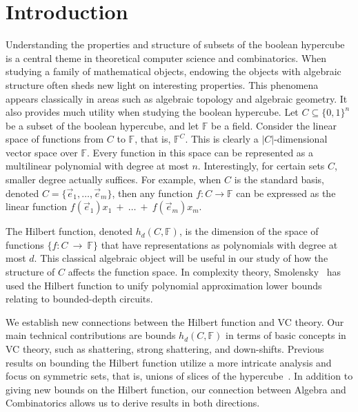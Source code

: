 \documentclass[11pt]{article}
\theoremstyle{definition}
\newcommand{\1}{\mathbf{1}}
\newcommand{\F}{{\mathbb F}}
\begin{document}
\section{Introduction}
Understanding  the properties and structure of subsets of the boolean hypercube is a central theme in theoretical computer science and combinatorics.   When studying a family of mathematical objects, endowing the objects with algebraic structure often sheds new light on interesting properties.  This phenomena appears classically in areas such as algebraic topology and algebraic geometry.  It also provides much utility when studying the boolean hypercube.  
Let $C\subseteq \{0,1\}^n$ be a subset of the boolean hypercube, and let $\F$ be a field. Consider the linear space of functions from $C$ to $\F$, that is,  $\F^{C}$.  This is clearly a $|C|$-dimensional vector space over $\F$. Every function in this space can be represented as a multilinear polynomial with degree at most $n$. Interestingly, for certain sets $C$, smaller degree actually suffices. For example, when $C$ is the standard basis, denoted $C=\{\vec e_1,\ldots,\vec e_m\}$, then any function $f:C\rightarrow\F$ can be expressed as the linear function $f(\vec e_1)x_1~+~\ldots~+~f(\vec e_m)x_m$.   

The Hilbert function, denoted  $h_d(C,\F)$, is the dimension of the space of functions $\{f:C~\to~\F\}$ that have representations as polynomials with degree at most $d$.  
This classical algebraic object will be useful in our study of how the structure of $C$ affects the function space.
In complexity theory, Smolensky~\cite{smolensky} has used the Hilbert function to unify 
polynomial approximation lower bounds relating to bounded-depth circuits.   

We establish new connections between the Hilbert function and VC theory. 
Our main technical contributions are bounds $h_d(C,\F)$ in terms of 
basic concepts in VC theory, such as shattering, strong shattering, and down-shifts.  Previous results on bounding the Hilbert function utilize a more intricate analysis and focus on symmetric sets, that is, unions of slices of the hypercube~\cite{smolensky, bernasconi}.  In addition to giving new bounds on the Hilbert function, our connection between Algebra and Combinatorics allows us to derive results in both directions.  
\end{document}
